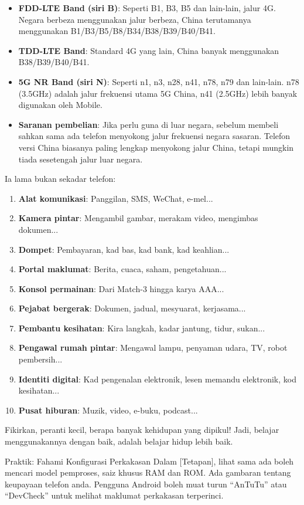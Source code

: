 \begin{itemize}
  \item \textbf{FDD-LTE Band (siri B)}: Seperti B1, B3, B5 dan lain-lain, jalur 4G. Negara berbeza menggunakan jalur berbeza, China terutamanya menggunakan B1/B3/B5/B8/B34/B38/B39/B40/B41.
  \item \textbf{TDD-LTE Band}: Standard 4G yang lain, China banyak menggunakan B38/B39/B40/B41.
  \item \textbf{5G NR Band (siri N)}: Seperti n1, n3, n28, n41, n78, n79 dan lain-lain. n78 (3.5GHz) adalah jalur frekuensi utama 5G China, n41 (2.5GHz) lebih banyak digunakan oleh Mobile.
  \item \textbf{Saranan pembelian}: Jika perlu guna di luar negara, sebelum membeli sahkan sama ada telefon menyokong jalur frekuensi negara sasaran. Telefon versi China biasanya paling lengkap menyokong jalur China, tetapi mungkin tiada sesetengah jalur luar negara.
\end{itemize}


Ia lama bukan sekadar telefon:

\begin{enumerate}
  \item \textbf{Alat komunikasi}: Panggilan, SMS, WeChat, e-mel...
  \item \textbf{Kamera pintar}: Mengambil gambar, merakam video, mengimbas dokumen...
  \item \textbf{Dompet}: Pembayaran, kad bas, kad bank, kad keahlian...
  \item \textbf{Portal maklumat}: Berita, cuaca, saham, pengetahuan...
  \item \textbf{Konsol permainan}: Dari Match-3 hingga karya AAA...
  \item \textbf{Pejabat bergerak}: Dokumen, jadual, mesyuarat, kerjasama...
  \item \textbf{Pembantu kesihatan}: Kira langkah, kadar jantung, tidur, sukan...
  \item \textbf{Pengawal rumah pintar}: Mengawal lampu, penyaman udara, TV, robot pembersih...
  \item \textbf{Identiti digital}: Kad pengenalan elektronik, lesen memandu elektronik, kod kesihatan...
  \item \textbf{Pusat hiburan}: Muzik, video, e-buku, podcast...
\end{enumerate}

Fikirkan, peranti kecil, berapa banyak kehidupan yang dipikul! Jadi, belajar menggunakannya dengan baik, adalah belajar hidup lebih baik.

\begin{tcbpractice}{Praktik: Fahami Konfigurasi Perkakasan}
Dalam [Tetapan], lihat sama ada boleh mencari model pemproses, saiz khusus RAM dan ROM. Ada gambaran tentang keupayaan telefon anda. Pengguna Android boleh muat turun “AnTuTu” atau “DevCheck” untuk melihat maklumat perkakasan terperinci.

\end{tcbpractice}
